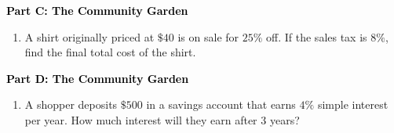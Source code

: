 \documentclass[12pt, letterpaper, fleqn]{article}
\newcommand{\blank}{\underline{\hspace{2.2cm}}}
\begin{document}
\newpage

\begin{tcolorbox}[colback=customteal!20]
\large\textcolor{black}{\textbf{Part C: The Community Garden}}
\end{tcolorbox}

\vspace{3mm}

\begin{enumerate}[itemsep=2.5cm, leftmargin=0.6cm, resume]
\item A shirt originally priced at $\$40$ is on sale for $25\%$ off. If the sales tax is $8\%$, find the final total cost of the shirt. \blank
\end{enumerate}

\newpage

\begin{tcolorbox}[colback=customteal!20]
\large\textcolor{black}{\textbf{Part D: The Community Garden}}
\end{tcolorbox}

\vspace{3mm}

\begin{enumerate}[itemsep=2.5cm, leftmargin=0.6cm, resume]
\item A shopper deposits $\$500$ in a savings account that earns $4\%$ simple interest per year. How much interest will they earn after 3 years? \blank
\end{enumerate}
\end{document}
